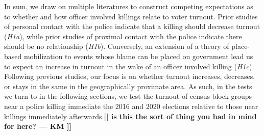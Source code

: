 \documentclass[12pt]{article}
\newcommand{\kscomment}[1]{\textbf{\textcolor{Thistle}{[[ #1 --- KS ]]}}}
\newcommand{\kmcomment}[1]{\textbf{\textcolor{JungleGreen}{[[ #1 --- KM ]]}}}
\begin{document}
In sum, we draw on multiple literatures to construct competing expectations as to whether and how officer involved killings relate to voter turnout. Prior studies of personal contact with the police indicate that a killing should decrease turnout (\textit{H1a}), while prior studies of proximal contact with the police indicate there should be no relationship (\textit{H1b}). Conversely, an extension of a theory of place-based mobilization to events whose blame can be placed on government lead us to expect an increase in turnout in the wake of an officer involved killing (\textit{H1c}). Following previous studies, our focus is on whether turnout increases, decreases, or stays in the same in the geographically proximate area. As such, in the tests we turn to in the following sections, we test the turnout of census block groups near a police killing immediate the 2016 and 2020 elections relative to those near killings immediately afterwards.\kmcomment{is this the sort of thing you had in mind for here?}


\end{document}

